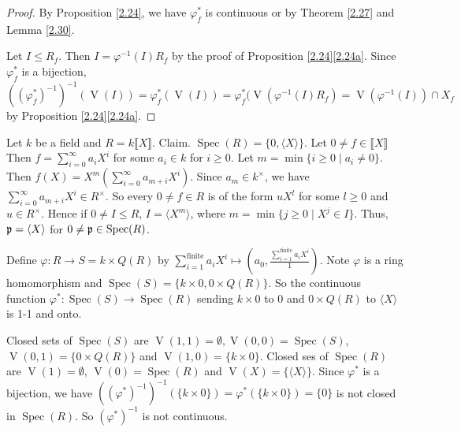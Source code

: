\begin{proof}
    By Proposition \ref{2.24}, we have $\varphi_f^*$ is continuous or by Theorem \ref{2.27} and Lemma \ref{2.30}. \par 
    Let $I \leq R_f$. Then $I = \varphi^{-1}(I)R_f$ by the proof of Proposition \ref{2.24}\ref{2.24a}. Since $\varphi_f^*$ is a bijection, $((\varphi_f^*)^{-1})^{-1}(\operatorname{V}(I)) = \varphi_f^*(\operatorname{V}(I)) = \varphi_f^*(\operatorname{V}(\varphi^{-1}(I)R_f) = \operatorname{V}(\varphi^{-1}(I)) \cap X_f$ by Proposition \ref{2.24}\ref{2.24a}. 
\end{proof}

\begin{example*}
    Let $k$ be a field and $R = k\llbracket X \rrbracket$. Claim. $\operatorname{Spec}(R) = \{0,\langle X \rangle\}$. Let $0 \neq f \in \llbracket X \rrbracket$ Then $f = \sum_{i=0}^\infty a_iX^i$ for some $a_i \in k$ for $i \geq 0$. Let $m = \min \{i \geq 0 \mid a_i \neq 0\}$. Then $f(X) = X^m(\sum_{i=0}^{\infty}a_{m+i}X^{i})$. Since $a_m \in k^\times$, we have $\sum_{i=0}^{\infty}a_{m+i}X^{i} \in R^\times$. So every $0 \neq f \in R$ is of the form $uX^l$ for some $l \geq 0$ and $u \in R^\times$. Hence if $0 \neq I \leq R$, $I = \langle X^m \rangle$, where $m = \min\{j \geq 0 \mid X^j \in I\}$. Thus, $\mathfrak{p} = \langle X \rangle$ for $0 \neq \mathfrak{p} \in \operatorname{Spec}(R)$. \par 
    Define $\varphi: R \to S = k \times Q(R)$ by $\sum_{i=1}^{\text{finite}} a_iX^i \mapsto (a_0,\frac{\sum_{i=1}^{\text{finite}} a_iX^i}{1})$. Note $\varphi$ is a ring homomorphism and $\operatorname{Spec}(S) = \{k \times 0, 0 \times Q(R)\}$. So the continuous function $\varphi^*: \operatorname{Spec}(S) \to \operatorname{Spec}(R)$ sending $k \times 0$ to $0$ and $0 \times Q(R)$ to $\langle X \rangle$ is 1-1 and onto. \par 
    Closed sets of $\operatorname{Spec}(S)$ are $\operatorname{V}(1,1) = \emptyset, \operatorname{V}(0,0) = \operatorname{Spec}(S)$, $\operatorname{V}(0,1) = \{0 \times Q(R)\}$ and $\operatorname{V}(1,0) = \{k \times 0\}$. Closed ses of $\operatorname{Spec}(R)$ are $\operatorname{V}(1) = \emptyset$, $\operatorname{V}(0) = \operatorname{Spec}(R)$ and $\operatorname{V}(X) = \{\langle X \rangle\}$. Since $\varphi^*$ is a bijection, we have $((\varphi^*)^{-1})^{-1}(\{k \times 0\}) = \varphi^*(\{k \times 0\}) = \{0\}$ is not closed in $\operatorname{Spec}(R)$. So $(\varphi^*)^{-1}$ is not continuous. 
\end{example*}

